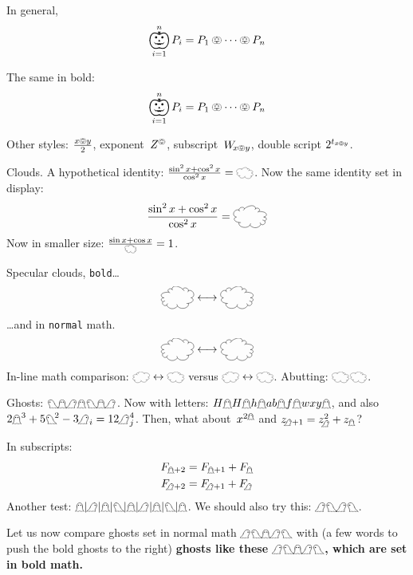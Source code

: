 \documentclass[a4paper]{article}
\begin{document}
In general,
\[ \bigpumpkin_{i=1}^{n} P_{i} = P_{1}\pumpkin\dots\pumpkin P_{n} \]

\begingroup

\bfseries\boldmath

The same in bold:
\[ \bigpumpkin_{i=1}^{n} P_{i} = P_{1}\pumpkin\dots\pumpkin P_{n} \]

\endgroup

Other styles: \( \frac{x\pumpkin y}{2} \), exponent~$Z^{\pumpkin}$, 
subscript~$W_{\!x\pumpkin y}$, double script \( 2^{t_{x\pumpkin y}} \).

\bigbreak

Clouds.  A hypothetical identity:
\( \frac{\sin^{2}x + \cos^{2}x}{\cos^{2}x} = \mathcloud \).
Now the same identity set in display:
\[ \frac{\sin^{2}x + \cos^{2}x}{\cos^{2}x} = \mathcloud \]
Now in smaller size: \( \frac{\sin x+\cos x}{\mathcloud} = 1 \).

Specular clouds, \texttt{bold}\ldots{}
\[ \reversemathcloud \longleftrightarrow \mathcloud \]
\ldots and in \texttt{normal} math.
\[ \reversemathcloud \longleftrightarrow \mathcloud \]
In-line math comparison:
{\boldmath \( \reversemathcloud \leftrightarrow \mathcloud \)}
versus \( \reversemathcloud \leftrightarrow \mathcloud \).
Abutting: {\boldmath $\mathcloud$}$\mathcloud$.

\bigbreak

Ghosts: \( \mathleftghost \mathghost \mathrightghost \mathghost \mathleftghost
\mathghost \mathrightghost \).  Now with letters: \( H \mathghost H \mathghost h
\mathghost ab \mathghost f \mathghost wxy \mathghost \), and also \(
2\mathghost^{3} + 5\mathleftghost^{\!2}-3\mathrightghost_{i} =
12\mathrightghost_{j}^{4} \).  Then, what about~$x^{2\mathghost}$ and \(
z_{\!\mathrightghost+1} = z_{\!\mathrightghost}^{2} + z_{\mathghost} \)?

In subscripts:
\begin{align*}
	F_{\mathghost+2} &= F_{\mathghost+1} + F_{\mathghost} \\
	F_{\!\mathrightghost+2} &= F_{\!\mathrightghost+1} + F_{\!\mathrightghost}
\end{align*}
Another test: \( \mathghost | \mathrightghost | \mathghost | \mathleftghost |
\mathghost | \mathrightghost | \mathghost | \mathleftghost | \mathghost \).  We
should also try this: \( \mathrightghost \mathleftghost \mathrightghost
\mathleftghost \).

Let us now compare ghosts set in normal math
\( \mathrightghost \mathleftghost \mathghost \mathrightghost \mathleftghost \)
with (a few words to push the bold ghosts to the right)
{\bfseries\boldmath ghosts like these
\( \mathrightghost \mathleftghost \mathghost \mathrightghost \mathleftghost \),
which are set in bold math.}
\end{document}
